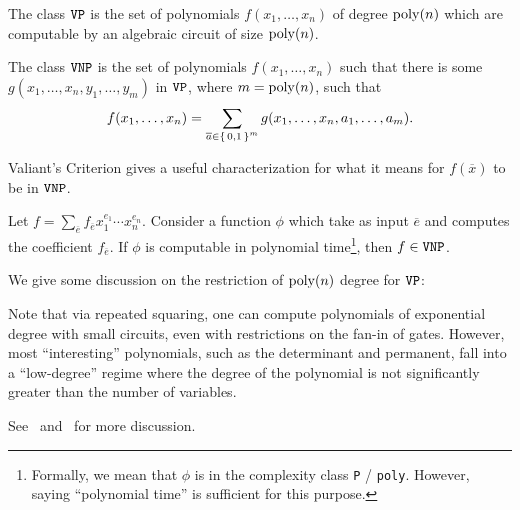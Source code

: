 \documentclass[letterpaper, 11pt]{amsart}
\newif\iffull
\begin{document}
\begin{defn}[$\VP$]\label{defn:VP}
  The class $\VP$ is the set of polynomials $f(x_1, \ldots, x_n)$ of degree $\poly(n)$ which are computable by an algebraic circuit of size $\poly(n)$.
\end{defn}

\iffull
\begin{defn}[$\VF$]\label{defn:VF}
  The class $\VF$ is the set of polynomials $f(x_1, \ldots, x_n)$ of degree $\poly(n)$ which are computable by an algebraic formula of size $\poly(n)$.
\end{defn}

\begin{defn}[$\VBP$]\label{defn:VBP}
  The class $\VBP$ is the set of polynomials $f(x_1, \ldots, x_n)$ of degree $\poly(n)$ which are computable by an algebraic branching program of size $\poly(n)$.
\end{defn}
\fi

\begin{defn}[$\VNP$]\label{defn:VNP}
  The class $\VNP$ is the set of polynomials $f(x_1, \ldots, x_n)$ such that there is some $g(x_1, \ldots, x_n, y_1, \ldots, y_m)$ in $\VP$, where $m = \operatorname{poly}(n)$, such that
  \[
    f(x_1, \ldots, x_n) = \sum_{\overline{a} \in \set{0, 1}^m} g(x_1, \ldots, x_n, a_1, \ldots, a_m).
  \]
\end{defn}

Valiant's Criterion gives a useful characterization for what it means for $f(\overline{x})$ to be in $\VNP$.
\begin{thrm}
  Let $f = \sum_{\overline{e}} f_{\overline{e}} x_1^{e_1} \cdots x_n^{e_n}$.
  Consider a function $\phi$ which take as input $\overline{e}$ and computes the coefficient $f_{\overline{e}}$.
  If $\phi$ is computable in polynomial time\footnote{Formally, we mean that $\phi$ is in the complexity class \texttt{P} / \texttt{poly}. However, saying ``polynomial time'' is sufficient for this purpose.}, then $f \in \operatorname{\texttt{VNP}}$.
\end{thrm}

\iffull
\clearpage
\fi

We give some discussion on the restriction of $\poly(n)$ degree for $\VP$:
\begin{rmk}
  Note that via repeated squaring, one can compute polynomials of exponential degree with small circuits, even with restrictions on the fan-in of gates.
  However, most ``interesting'' polynomials, such as the determinant and permanent, fall into a ``low-degree'' regime where the degree of the polynomial is not significantly greater than the number of variables.
  \iffull
  Originally, Valiant was studying formulas, not circuits.
  One can easily see from \Cref{defn:formula} that a formula of depth $\Delta$ must compute a polynomial of degree $\bigO{\Delta}$ if we restrict to constant fan-in.
  \fi
  See~\cite{Sap21} and~\cite{Gro} for more discussion.
\end{rmk}
\end{document}
